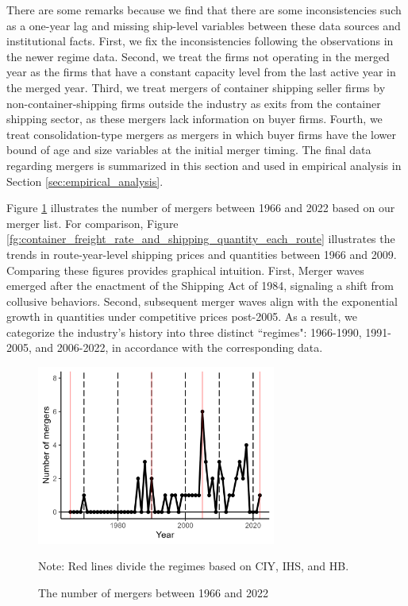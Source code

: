 \documentclass[10pt]{article}
\begin{document}
There are some remarks because we find that there are some inconsistencies such as a one-year lag and missing ship-level variables between these data sources and institutional facts.
First, we fix the inconsistencies following the observations in the newer regime data. 
Second, we treat the firms not operating in the merged year as the firms that have a constant capacity level from the last active year in the merged year. %
Third, we treat mergers of container shipping seller firms by non-container-shipping firms outside the industry as exits from the container shipping sector, as these mergers lack information on buyer firms.
Fourth, we treat consolidation-type mergers as mergers in which buyer firms have the lower bound of age and size variables at the initial merger timing.
The final data regarding mergers is summarized in this section and used in empirical analysis in Section \ref{sec:empirical_analysis}. 



Figure \ref{fg:number_of_mergers} illustrates the number of mergers between 1966 and 2022 based on our merger list.
For comparison, Figure \ref{fg:container_freight_rate_and_shipping_quantity_each_route} illustrates the trends in route-year-level shipping prices and quantities between 1966 and 2009.
Comparing these figures provides graphical intuition. 
First, Merger waves emerged after the enactment of the Shipping Act of 1984, signaling a shift from collusive behaviors.
Second, subsequent merger waves align with the exponential growth in quantities under competitive prices post-2005.
As a result, we categorize the industry's history into three distinct ``regimes": 1966-1990, 1991-2005, and 2006-2022, in accordance with the corresponding data.


\begin{figure}[!ht]
\begin{center}
  \includegraphics[width = 0.7\textwidth]
  {figuretable/number_of_mergers.png}
  \caption{The number of mergers between 1966 and 2022}
  \label{fg:number_of_mergers}
  \end{center}
\footnotesize
   Note: Red lines divide the regimes based on CIY, IHS, and HB.
\end{figure}
\end{document}
